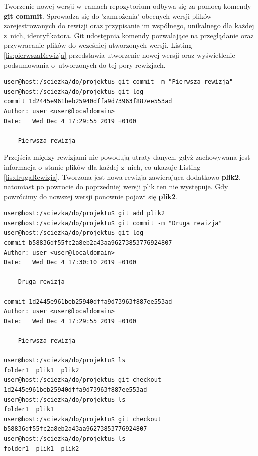 Tworzenie nowej wersji w~ramach repozytorium odbywa się za pomocą komendy \textbf{git commit}. Sprowadza się do 'zamrożenia' obecnych wersji plików zarejestrowanych do rewizji oraz przypisanie im wspólnego, unikalnego dla każdej z~nich, identyfikatora. Git udostępnia komendy pozwalające na przeglądanie oraz przywracanie plików do wcześniej utworzonych wersji. Listing \ref{lis:pierwszaRewizja} przedstawia utworzenie nowej wersji oraz wyświetlenie podsumowania o~utworzonych do tej pory rewizjach.

\begin{lstlisting}[label={lis:pierwszaRewizja}, language=Cmd,caption={Utworzenie nowej rewizji}]
user@host:/sciezka/do/projektu$ git commit -m "Pierwsza rewizja"
user@host:/sciezka/do/projektu$ git log 
commit 1d2445e961beb25940dffa9d73963f887ee553ad
Author: user <user@localdomain>
Date:   Wed Dec 4 17:29:55 2019 +0100

    Pierwsza rewizja
\end{lstlisting}

Przejścia między rewizjami nie powodują utraty danych, gdyż zachowywana jest informacja o~stanie plików dla każdej z~nich, co ukazuje Listing \ref{lis:drugaRewizja}. Tworzona jest nowa rewizja zawierająca dodatkowo \textbf{plik2}, natomiast po powrocie do poprzedniej wersji plik ten nie występuje. Gdy powrócimy do nowszej wersji ponownie pojawi się \textbf{plik2}.

\newpage
\begin{lstlisting}[language=Cmd,caption={Podsumowanie rewizji, powrót do starszej wersji},label={lis:drugaRewizja}]
user@host:/sciezka/do/projektu$ git add plik2
user@host:/sciezka/do/projektu$ git commit -m "Druga rewizja"
user@host:/sciezka/do/projektu$ git log 
commit b58836df55fc2a8eb2a43aa96273853776924807
Author: user <user@localdomain>
Date:   Wed Dec 4 17:30:10 2019 +0100

    Druga rewizja

commit 1d2445e961beb25940dffa9d73963f887ee553ad
Author: user <user@localdomain>
Date:   Wed Dec 4 17:29:55 2019 +0100

    Pierwsza rewizja

user@host:/sciezka/do/projektu$ ls
folder1  plik1  plik2
user@host:/sciezka/do/projektu$ git checkout 1d2445e961beb25940dffa9d73963f887ee553ad
user@host:/sciezka/do/projektu$ ls
folder1  plik1
user@host:/sciezka/do/projektu$ git checkout b58836df55fc2a8eb2a43aa96273853776924807
user@host:/sciezka/do/projektu$ ls
folder1  plik1  plik2
\end{lstlisting}

